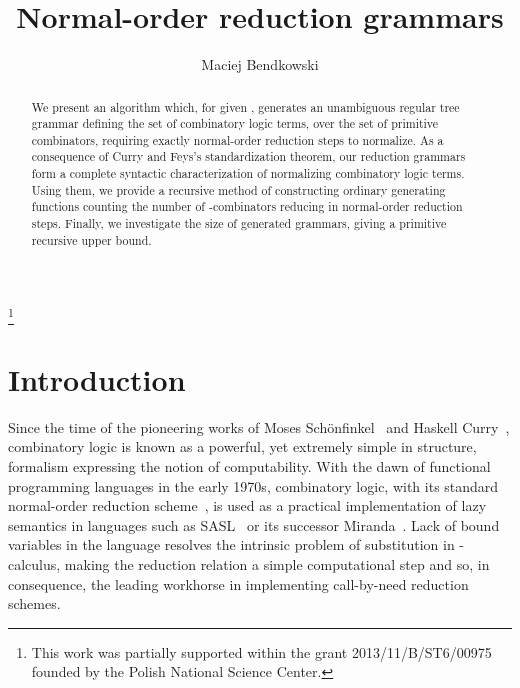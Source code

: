 \documentclass[11pt,a4paper]{amsart}
\theoremstyle{definition}
\begin{document}
\title{Normal-order reduction grammars}
\author{Maciej Bendkowski}
\address{
  Theoretical Computer Science Department\\
  Faculty of Mathematics and Computer Science\\
  Jagiellonian University\\
  ul. Prof. {\L}ojasiewicza 6, 30-348 Krak\'ow, Poland}
\thanks{This work was partially supported within the grant 2013/11/B/ST6/00975
            founded by the Polish National Science Center.} 

\maketitle

\begin{abstract}
We present an algorithm which, for given , generates an unambiguous regular tree grammar defining the set of combinatory logic terms, over the set  of primitive combinators, requiring exactly  normal-order reduction steps to normalize. As a consequence of Curry and Feys's standardization theorem, our reduction grammars form a complete syntactic characterization of normalizing combinatory logic terms. Using them, we provide a recursive method of constructing ordinary generating functions counting the number of -combinators reducing in  normal-order reduction steps. Finally, we investigate the size of generated grammars, giving a primitive recursive upper bound.
\end{abstract}

\section{Introduction}

Since the time of the pioneering works of Moses Schönfinkel~\cite{schonfinkel} and Haskell Curry~\cite{curry}, combinatory logic is known as a powerful, yet extremely simple in structure, formalism expressing the notion of computability. With the dawn of functional programming languages in the early 1970s,
combinatory logic, with its standard normal-order reduction scheme~\cite{curry-feys1958}, is used as a practical implementation of
lazy semantics in languages such as SASL~\cite{turner1979} or its successor
Miranda~\cite{turner1986}. Lack of bound variables in the language resolves
the intrinsic problem of substitution in \mbox{-calculus}, making the reduction relation a simple computational step and so, in consequence, the leading workhorse in implementing call-by-need reduction schemes.
\end{document}
